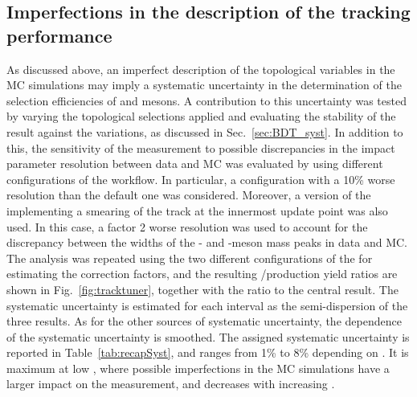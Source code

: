 \subsection{Imperfections in the description of the tracking performance}
As discussed above, an imperfect description of the topological variables in the MC simulations may imply a systematic uncertainty in the determination of the selection efficiencies of \ds and \dpl mesons. A contribution to this uncertainty was tested by varying the topological selections applied and evaluating the stability of the result against the variations, as discussed in Sec.~\ref{sec:BDT_syst}. In addition to this, the sensitivity of the measurement to possible discrepancies in the impact parameter resolution between data and MC was evaluated by using different configurations of the  workflow. In particular, a configuration with a 10\% worse resolution than the default one was considered. Moreover, a version of the  implementing a smearing of the track \pt at the innermost update point was also used. In this case, a factor 2 worse \pt resolution was used to account for the discrepancy between the widths of the \ds- and \dpl-meson mass peaks in data and MC. The analysis was repeated using the two different configurations of the  for estimating the correction factors, and the resulting \ds/\dpl production yield ratios are shown in Fig.~\ref{fig:tracktuner}, together with the ratio to the central result. The systematic uncertainty is estimated for each \pt interval as the semi-dispersion of the three results. As for the other sources of systematic uncertainty, the \pt dependence of the systematic uncertainty is smoothed. The assigned systematic uncertainty is reported in Table~\ref{tab:recapSyst}, and ranges from 1\% to 8\% depending on \pt. It is maximum at low \pt, where possible imperfections in the MC simulations have a larger impact on the measurement, and decreases with increasing \pt.


